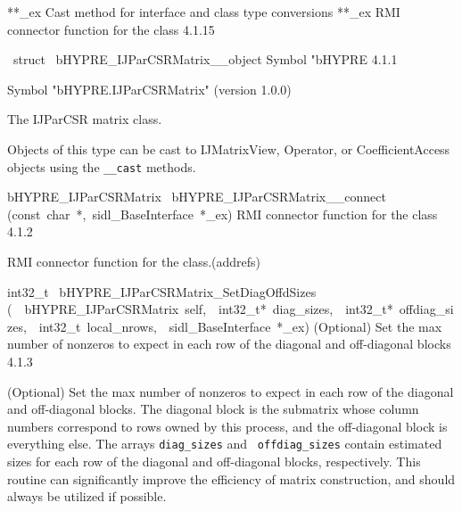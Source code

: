 \documentclass{article}
\begin{document}
\begin{cxxentry}
\begin{cxxentry}
\begin{cxxnames}
        {**\_ex}
        {}
        {
Cast method for interface and class type conversions}
        {}
\label{cxx.4.1.43}
        {**\_ex}
        {}
        {
RMI connector function for the class}
        {4.1.15}
\end{cxxnames}
\begin{cxxvariable}
{\ struct\ }
        {bHYPRE\_IJParCSRMatrix\_\_object}
        {}
        {
Symbol "bHYPRE}
        {4.1.1}
\begin{cxxdoc}

Symbol "bHYPRE.IJParCSRMatrix" (version 1.0.0)

The IJParCSR matrix class.

Objects of this type can be cast to IJMatrixView, Operator, or
CoefficientAccess objects using the {\tt \_\_cast} methods.
\end{cxxdoc}
\end{cxxvariable}
\begin{cxxfunction}
{bHYPRE\_IJParCSRMatrix\ }
        {bHYPRE\_IJParCSRMatrix\_\_connect}
        {(const\ char\ *,\ sidl\_BaseInterface\ *\_ex)}
        {
RMI connector function for the class}
        {4.1.2}
\begin{cxxdoc}

RMI connector function for the class.(addrefs)
\end{cxxdoc}
\end{cxxfunction}
\begin{cxxfunction}
{int32\_t\ }
        {bHYPRE\_IJParCSRMatrix\_SetDiagOffdSizes}
        {(\ \ bHYPRE\_IJParCSRMatrix\ self,\ \ int32\_t*\ diag\_sizes,\ \ int32\_t*\ offdiag\_sizes,\ \ int32\_t\ local\_nrows,\ \ sidl\_BaseInterface\ *\_ex)}
        {
(Optional) Set the max number of nonzeros to expect in each
row of the diagonal and off-diagonal blocks}
        {4.1.3}
\begin{cxxdoc}

(Optional) Set the max number of nonzeros to expect in each
row of the diagonal and off-diagonal blocks.  The diagonal
block is the submatrix whose column numbers correspond to
rows owned by this process, and the off-diagonal block is
everything else.  The arrays {\tt diag\_sizes} and {\tt
offdiag\_sizes} contain estimated sizes for each row of the
diagonal and off-diagonal blocks, respectively.  This routine
can significantly improve the efficiency of matrix
construction, and should always be utilized if possible.


\end{cxxdoc}
\end{cxxfunction}
\end{cxxentry}
\end{cxxentry}
\end{document}
